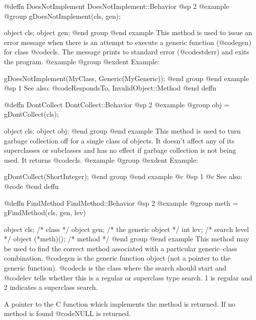 @deffn {DoesNotImplement} DoesNotImplement::Behavior
@sp 2
@example
@group
gDoesNotImplement(cls, gen);

object  cls;
object  gen;
@end group
@end example
This method is used to issue an error message when there is an attempt 
to execute a generic function (@code{gen}) for class @code{cls}.
The message prints to standard error (@code{stderr}) and exits the program.
@example
@group
@exdent Example:

gDoesNotImplement(MyClass, Generic(MyGeneric));
@end group
@end example
@sp 1
See also:  @code{RespondsTo, InvalidObject::Method}
@end deffn











@deffn {DontCollect} DontCollect::Behavior
@sp 2
@example
@group
obj = gDontCollect(cls);

object  cls;
object  obj;
@end group
@end example
This method is used to turn garbage collection off for a single
class of objects.  It doesn't affect any of its superclasses or subclasses and
has no effect if garbage collection is not being used.  It returns
@code{cls}.
@example
@group
@exdent Example:

gDontCollect(ShortInteger);
@end group
@end example
@c @sp 1
@c See also:  @code{}
@end deffn












@deffn {FindMethod} FindMethod::Behavior
@sp 2
@example
@group
meth = gFindMethod(cls, gen, lev)

object  cls;    /* class                */
object  gen;    /* the generic object   */
int     lev;    /* search level         */
object  (*meth)();  /*  method          */
@end group
@end example
This method may be used to find the correct method associated with a
particular generic--class combination.  @code{gen} is the generic
function object (not a pointer to the generic function).  @code{cls} is
the class where the search should start and @code{lev} tells whether
this is a regular or superclass type search.  1 is regular and 2
indicates a superclass search.

A pointer to the C function which implements the method is returned.  If no
method is found @code{NULL} is returned.


